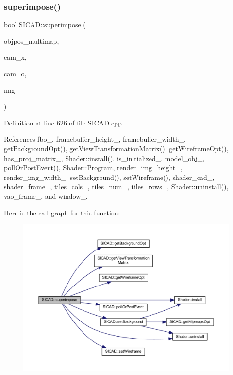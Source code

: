 \subsubsection{\texorpdfstring{superimpose()}{superimpose()}\hspace{0.1cm}{\footnotesize\ttfamily [2/4]}}
{\footnotesize\ttfamily bool S\+I\+C\+A\+D\+::superimpose (\begin{DoxyParamCaption}\item[{const std\+::vector$<$ \mbox{\hyperlink{classSuperimpose_a178e3d4e2def6635bfcf9454dd4b5d22}{Model\+Pose\+Container}} $>$ \&}]{objpos\+\_\+multimap,  }\item[{const double $\ast$}]{cam\+\_\+x,  }\item[{const double $\ast$}]{cam\+\_\+o,  }\item[{cv\+::\+Mat \&}]{img }\end{DoxyParamCaption})\hspace{0.3cm}{\ttfamily [virtual]}}



Definition at line 626 of file S\+I\+C\+A\+D.\+cpp.



References fbo\+\_\+, framebuffer\+\_\+height\+\_\+, framebuffer\+\_\+width\+\_\+, get\+Background\+Opt(), get\+View\+Transformation\+Matrix(), get\+Wireframe\+Opt(), has\+\_\+proj\+\_\+matrix\+\_\+, Shader\+::install(), is\+\_\+initialized\+\_\+, model\+\_\+obj\+\_\+, poll\+Or\+Post\+Event(), Shader\+::\+Program, render\+\_\+img\+\_\+height\+\_\+, render\+\_\+img\+\_\+width\+\_\+, set\+Background(), set\+Wireframe(), shader\+\_\+cad\+\_\+, shader\+\_\+frame\+\_\+, tiles\+\_\+cols\+\_\+, tiles\+\_\+num\+\_\+, tiles\+\_\+rows\+\_\+, Shader\+::uninstall(), vao\+\_\+frame\+\_\+, and window\+\_\+.

Here is the call graph for this function\+:
\nopagebreak
\begin{figure}[H]
\begin{center}
\leavevmode
\includegraphics[width=350pt]{classSICAD_ab15f84cec5a65c8dd6cad85f9b0e1993_cgraph}
\end{center}
\end{figure}
\mbox{\label{classSICAD_af6c19a679de29992c5f9609f4424add0}} 
